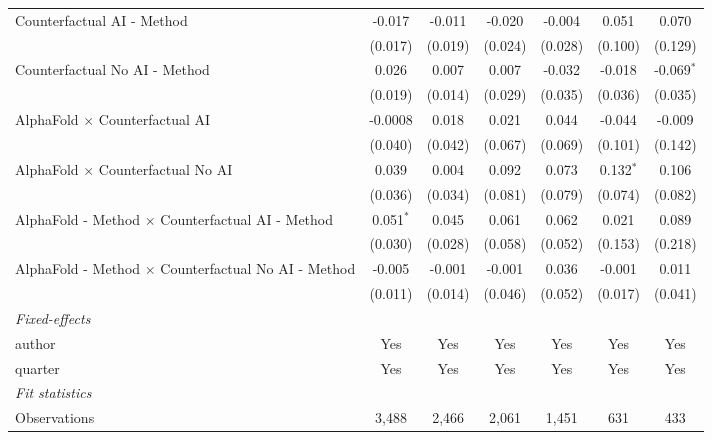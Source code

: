 \begin{tabular}{lcccccc}
   Counterfactual AI - Method                                 & -0.017      & -0.011  & -0.020  & -0.004  & 0.051       & 0.070\\   
                                                              & (0.017)     & (0.019) & (0.024) & (0.028) & (0.100)     & (0.129)\\   
   Counterfactual No AI - Method                              & 0.026       & 0.007   & 0.007   & -0.032  & -0.018      & -0.069$^{*}$\\   
                                                              & (0.019)     & (0.014) & (0.029) & (0.035) & (0.036)     & (0.035)\\   
   AlphaFold $\times$ Counterfactual AI                       & -0.0008     & 0.018   & 0.021   & 0.044   & -0.044      & -0.009\\   
                                                              & (0.040)     & (0.042) & (0.067) & (0.069) & (0.101)     & (0.142)\\   
   AlphaFold $\times$ Counterfactual No AI                    & 0.039       & 0.004   & 0.092   & 0.073   & 0.132$^{*}$ & 0.106\\   
                                                              & (0.036)     & (0.034) & (0.081) & (0.079) & (0.074)     & (0.082)\\   
   AlphaFold - Method $\times$ Counterfactual AI - Method     & 0.051$^{*}$ & 0.045   & 0.061   & 0.062   & 0.021       & 0.089\\   
                                                              & (0.030)     & (0.028) & (0.058) & (0.052) & (0.153)     & (0.218)\\   
   AlphaFold - Method $\times$ Counterfactual No AI - Method  & -0.005      & -0.001  & -0.001  & 0.036   & -0.001      & 0.011\\   
                                                              & (0.011)     & (0.014) & (0.046) & (0.052) & (0.017)     & (0.041)\\   
   \midrule
   \emph{Fixed-effects}\\
   author                                                     & Yes         & Yes     & Yes     & Yes     & Yes         & Yes\\  
   quarter                                                    & Yes         & Yes     & Yes     & Yes     & Yes         & Yes\\  
   \midrule
   \emph{Fit statistics}\\
   Observations                                               & 3,488       & 2,466   & 2,061   & 1,451   & 631         & 433\\  

\end{tabular}
